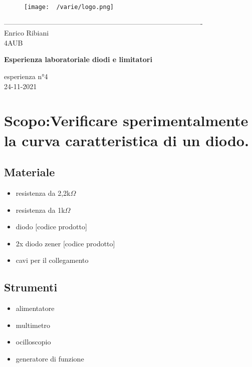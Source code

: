 \documentclass[12pt]{article}
\begin{document}
    \begin{titlepage}
    \begin{center}
\begin{figure}
    \centering
    \texttt{[image: ~/varie/logo.png]}
    \label{fig:logo}
\end{figure}
-------------------------------------------------------------------------------------\\
\vspace{2\baselineskip}
\large Enrico Ribiani\\
\large 4AUB\\
\vfill

\Huge{\textbf{Esperienza laboratoriale diodi e limitatori}}\\
\vfill

\LARGE{esperienza n°4}\\
\vfill
\large{24-11-2021}
\end{center}
\end{titlepage}
\tableofcontents
\vskip 1cm
\section{Scopo:Verificare sperimentalmente la curva caratteristica di un diodo.}
    \subsection{Materiale}
    \begin{itemize}
        \item resistenza da 2,2k$\Omega$
        \item resistenza da 1k$\Omega$
        \item diodo [codice prodotto]
        \item 2x diodo zener [codice prodotto]
       
        \item cavi per il collegamento
    \end{itemize}
    \subsection{Strumenti}
    \begin{itemize}
        \item alimentatore
        \item multimetro
        \item ocilloscopio
        \item generatore di funzione
    \end{itemize}
\end{document}
